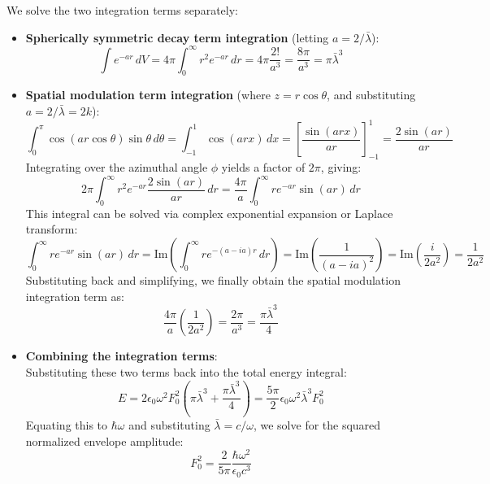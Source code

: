 \documentclass[12pt, a4paper]{article}
\begin{document}
We solve the two integration terms separately:
\begin{itemize}
    \item \textbf{Spherically symmetric decay term integration} (letting $a = 2/\bar{\lambda}$):
    \begin{equation}
    \int e^{-ar} \, dV = 4\pi \int_0^\infty r^2 e^{-ar} \, dr = 4\pi \frac{2!}{a^3} = \frac{8\pi}{a^3} = \pi \bar{\lambda}^3
    \end{equation}
    
    \item \textbf{Spatial modulation term integration} (where $z = r\cos\theta$, and substituting $a = 2/\bar{\lambda} = 2k$):
    \begin{equation}
    \int_0^\pi \cos(ar\cos\theta) \sin\theta \, d\theta = \int_{-1}^1 \cos(arx) \, dx = \left[ \frac{\sin(arx)}{ar} \right]_{-1}^1 = \frac{2\sin(ar)}{ar}
    \end{equation}
    Integrating over the azimuthal angle $\phi$ yields a factor of $2\pi$, giving:
    \begin{equation}
    2\pi \int_0^\infty r^2 e^{-ar} \frac{2\sin(ar)}{ar} \, dr = \frac{4\pi}{a} \int_0^\infty r e^{-ar} \sin(ar) \, dr
    \end{equation}
    This integral can be solved via complex exponential expansion or Laplace transform:
    \begin{equation}
    \int_0^\infty r e^{-ar} \sin(ar) \, dr = \text{Im}\left( \int_0^\infty r e^{-(a-ia)r} \, dr \right) = \text{Im}\left( \frac{1}{(a-ia)^2} \right) = \text{Im}\left( \frac{i}{2a^2} \right) = \frac{1}{2a^2}
    \end{equation}
    Substituting back and simplifying, we finally obtain the spatial modulation integration term as:
    \begin{equation}
    \frac{4\pi}{a} \left( \frac{1}{2a^2} \right) = \frac{2\pi}{a^3} = \frac{\pi \bar{\lambda}^3}{4}
    \end{equation}
    
    \item \textbf{Combining the integration terms}: \\
    Substituting these two terms back into the total energy integral:
    \begin{equation}
    E = 2 \epsilon_0 \omega^2 F_0^2 \left( \pi \bar{\lambda}^3 + \frac{\pi \bar{\lambda}^3}{4} \right) = \frac{5\pi}{2} \epsilon_0 \omega^2 \bar{\lambda}^3 F_0^2
    \end{equation}
    Equating this to $\hbar\omega$ and substituting $\bar{\lambda} = c/\omega$, we solve for the squared normalized envelope amplitude:
    \begin{equation}
    F_0^2 = \frac{2}{5\pi} \frac{\hbar \omega^2}{\epsilon_0 c^3}
    \end{equation}
\end{itemize}
\end{document}
